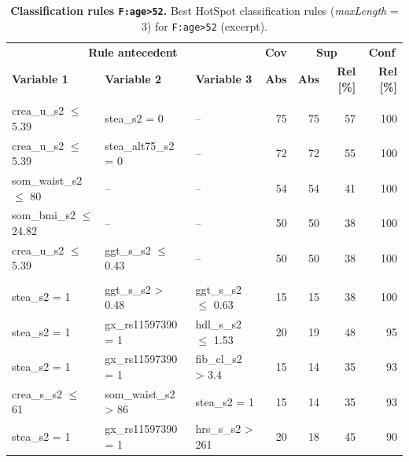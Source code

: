 \documentclass[
  oneside]{book}
\begin{document}
\begin{table}[!h]

\caption{\label{tab:03-rule-list-menopause}\textbf{Classification rules \texttt{F:age\textgreater{}52}.} Best HotSpot classification rules (\emph{maxLength} = 3) for \texttt{F:age\textgreater{}52} (excerpt).}
\centering
\begin{tabular}[t]{lllrrrr}
\toprule
\multicolumn{3}{c}{\textbf{Rule antecedent}} & \multicolumn{1}{c}{\textbf{Cov}} & \multicolumn{2}{c}{\textbf{Sup}} & \multicolumn{1}{c}{\textbf{Conf}} \\
\cmidrule(l{3pt}r{3pt}){1-3} \cmidrule(l{3pt}r{3pt}){4-4} \cmidrule(l{3pt}r{3pt}){5-6} \cmidrule(l{3pt}r{3pt}){7-7}
\textbf{Variable 1} & \textbf{Variable 2} & \textbf{Variable 3} & \textbf{Abs} & \textbf{Abs} & \textbf{Rel [\%]} & \textbf{Rel [\%]}\\
\midrule
\addlinespace[0.3em]
\multicolumn{7}{l}{\textbf{Target class: A}}\\
\hspace{1em}crea\_u\_s2 $\leq$ 5.39 & stea\_s2 = 0 & -- & 75 & 75 & 57 & 100\\
\hspace{1em}crea\_u\_s2 $\leq$ 5.39 & stea\_alt75\_s2 = 0 & -- & 72 & 72 & 55 & 100\\
\hspace{1em}som\_waist\_s2 $\leq$ 80 & -- & -- & 54 & 54 & 41 & 100\\
\hspace{1em}som\_bmi\_s2 $\leq$ 24.82 & -- & -- & 50 & 50 & 38 & 100\\
\hspace{1em}crea\_u\_s2 $\leq$ 5.39 & ggt\_s\_s2 $\leq$ 0.43 & -- & 50 & 50 & 38 & 100\\
\addlinespace[0.3em]
\multicolumn{7}{l}{\textbf{Target class: B}}\\
\hspace{1em}stea\_s2 = 1 & ggt\_s\_s2 > 0.48 & ggt\_s\_s2 $\leq$ 0.63 & 15 & 15 & 38 & 100\\
\hspace{1em}stea\_s2 = 1 & gx\_rs11597390 = 1 & hdl\_s\_s2 $\leq$ 1.53 & 20 & 19 & 48 & 95\\
\hspace{1em}stea\_s2 = 1 & gx\_rs11597390 = 1 & fib\_cl\_s2 > 3.4 & 15 & 14 & 35 & 93\\
\hspace{1em}crea\_s\_s2 $\leq$ 61 & som\_waist\_s2 > 86 & stea\_s2 = 1 & 15 & 14 & 35 & 93\\
\hspace{1em}stea\_s2 = 1 & gx\_rs11597390 = 1 & hrs\_s\_s2 > 261 & 20 & 18 & 45 & 90\\

\end{tabular}
\end{table}
\end{document}

